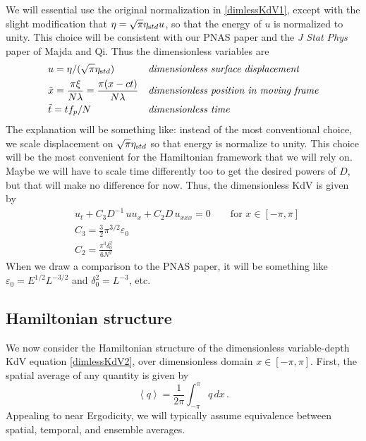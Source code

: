 \documentclass[11pt]{article}
\newcommand{\mean}[1]{\left< #1 \right>}
\newcommand{\eps}{\varepsilon}
\newcommand{\freqp}{f_p}
\newcommand{\etastd}{\eta_{\text std}}
\newcommand{\lam}{\lambda}
\newcommand{\lamfac}{N}
\newcommand{\drat}{D}
\newcommand{\epsup}{\eps_0}
\newcommand{\delup}{\delta_0}
\newcommand{\dx}{\, dx}
\begin{document}
We will essential use the original normalization in \eqref{dimlessKdV1}, except with the slight modification that $\eta = \sqrt{\pi} \etastd u$, so that the energy of $u$ is normalized to unity. This choice will be consistent with our PNAS paper and the {\it J Stat Phys} paper of Majda and Qi.
Thus the dimensionless variables are
\begin{align}
&u = \eta/(\sqrt{\pi} \etastd)
&&\mbox{\em dimensionless surface displacement} \\
&\tilde{x} = \frac{\pi \xi}{\lamfac \lam} = \frac{\pi (x-ct)}{\lamfac \lam}
&&\mbox{\em dimensionless position in moving frame} \\
& \tilde{t} = t \freqp / \lamfac
&&\mbox{\em dimensionless time}
\end{align}
The explanation will be something like: instead of the most conventional choice, we scale displacement on $\sqrt{\pi} \etastd$ so that energy is normalize to unity. This choice will be the most convenient for the Hamiltonian framework that we will rely on. Maybe we will have to scale time differently too to get the desired powers of $\drat$, but that will make no difference for now.
Thus, the dimensionless KdV is given by
\begin{align}
\label{dimlessKdV2}
&u_t + C_3 \drat^{-1} \, u u_x + C_2 \drat \, u_{xxx} = 0
\qquad \text{for } x \in [-\pi,\pi] \\
&C_3 = \frac{3}{2} \pi^{3/2} \epsup  \\
&C_2 = \frac{\pi^3 \delup^2}{6 \lamfac^2} 
\end{align}
When we draw a comparison to the PNAS paper, it will be something like $\epsup = E^{1/2}L^{-3/2}$ and $\delup^2 = L^{-3}$, etc.


\subsection{Hamiltonian structure}

We now consider the Hamiltonian structure of the dimensionless variable-depth KdV equation \eqref{dimlessKdV2}, over dimensionless domain $x \in [-\pi,\pi]$. First, the spatial average of any quantity is given by
\begin{equation}
\mean{q} = \frac{1}{2\pi} \int_{-\pi}^{\pi} q \dx \, .
\end{equation}
Appealing to near Ergodicity, we will typically assume equivalence between spatial, temporal, and ensemble averages. 
\end{document}
